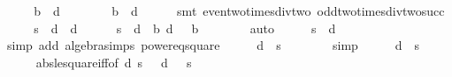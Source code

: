 \begin{isabellebody}
\isanewline
\ \ \isamarkupfalse%
\ \isamarkupfalse%
\ {\isachardoublequoteopen}b\ {\isasymle}\ d\ {\isacharminus}\ {}{\isachardoublequoteclose}\isanewline
\ \ \ \ \isamarkupfalse%
\ {\isacharbackquoteopen}b\ {\isacharless}\ d{\isacharbackquoteclose}\isanewline
\ \ \ \ \isamarkupfalse%
\ {\isacharparenleft}smt\ even{\isacharunderscore}two{\isacharunderscore}times{\isacharunderscore}div{\isacharunderscore}two\ odd{\isacharunderscore}two{\isacharunderscore}times{\isacharunderscore}div{\isacharunderscore}two{\isacharunderscore}succ{\isacharparenright}\isanewline
\isanewline
\ \ \isamarkupfalse%
\ \isamarkupfalse%
\ {\isachardoublequoteopen}{}{\isacharasterisk}s\ {\isasymge}\ d{\isacharcircum}{}\ {\isacharminus}\ {\isacharparenleft}d{\isacharminus}{}{\isacharparenright}{\isacharcircum}{}{\isachardoublequoteclose}\isanewline
\ \ \ \ \isamarkupfalse%
\ {\isacharbackquoteopen}{}{\isacharasterisk}s\ {\isacharequal}\ d{\isacharcircum}{}\ {\isacharminus}\ b{\isacharcircum}{}{\isacharbackquoteclose}\ {\isacharbackquoteopen}d\ {\isachargreater}\ {}{\isacharbackquoteclose}\ {\isacharbackquoteopen}b\ {\isachargreater}\ {}{\isacharbackquoteclose}\isanewline
\ \ \ \ \isamarkupfalse%
\ auto\isanewline
\ \ \isamarkupfalse%
\ \isamarkupfalse%
\ {\isachardoublequoteopen}s\ {\isasymge}\ {}{\isacharasterisk}{\isacharparenleft}d\ {\isacharminus}\ {}{\isacharparenright}{\isachardoublequoteclose}\isanewline
\ \ \ \ \isamarkupfalse%
\ {\isacharparenleft}simp\ add{\isacharcolon}\ algebra{\isacharunderscore}simps\ power{}{\isacharunderscore}eq{\isacharunderscore}square{\isacharparenright}\isanewline
\ \ \isamarkupfalse%
\ \isamarkupfalse%
\ {\isachardoublequoteopen}{}{\isacharasterisk}d\ {\isasymle}\ s\ {\isacharplus}\ {}{\isachardoublequoteclose}\isanewline
\ \ \ \ \isamarkupfalse%
\ simp\isanewline
\ \ \isamarkupfalse%
\ \isamarkupfalse%
\ {\isachardoublequoteopen}{}{\isacharasterisk}d{\isacharcircum}{}\ {\isasymle}\ {\isacharparenleft}s\ {\isacharplus}\ {}{\isacharparenright}{\isacharcircum}{}{\isachardoublequoteclose}\isanewline
\ \ \ \ \isamarkupfalse%
\ abs{\isacharunderscore}le{\isacharunderscore}square{\isacharunderscore}iff{\isacharbrackleft}of\ {\isachardoublequoteopen}{}{\isacharasterisk}d{\isachardoublequoteclose}\ {\isachardoublequoteopen}s\ {\isacharplus}\ {}{\isachardoublequoteclose}{\isacharbrackright}\ {\isacharbackquoteopen}d\ {\isachargreater}\ {}{\isacharbackquoteclose}\ {\isacharbackquoteopen}s\ {\isachargreater}\ {}{\isacharbackquoteclose}\isanewline

\end{isabellebody}
